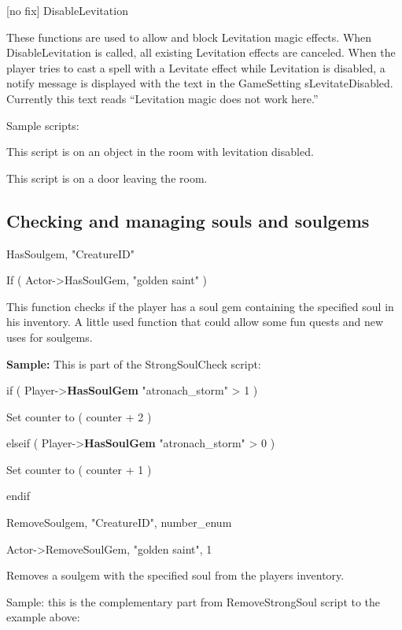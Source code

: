 \documentclass[
]{article}
\begin{document}
{[}no fix{]} DisableLevitation

These functions are used to allow and block Levitation magic effects.
When DisableLevitation is called, all existing Levitation effects are
canceled. When the player tries to cast a spell with a Levitate effect
while Levitation is disabled, a notify message is displayed with the
text in the GameSetting sLevitateDisabled. Currently this text reads
``Levitation magic does not work here.''

Sample scripts:

This script is on an object in the room with levitation disabled.



This script is on a door leaving the room.



\hypertarget{checking-and-managing-souls-and-soulgems}{%
\subsection{Checking and managing souls and
soulgems}\label{checking-and-managing-souls-and-soulgems}}

HasSoulgem, "CreatureID"

If ( Actor-\textgreater HasSoulGem, "golden saint" )

This function checks if the player has a soul gem containing the
specified soul in his inventory. A little used function that could allow
some fun quests and new uses for soulgems.

\textbf{Sample:} This is part of the StrongSoulCheck script:

if ( Player-\textgreater{}\textbf{HasSoulGem} "atronach\_storm"
\textgreater{} 1 )

Set counter to ( counter + 2 )

elseif ( Player-\textgreater{}\textbf{HasSoulGem} "atronach\_storm"
\textgreater{} 0 )

Set counter to ( counter + 1 )

endif

RemoveSoulgem, "CreatureID", number\_enum

Actor-\textgreater RemoveSoulGem, "golden saint", 1

Removes a soulgem with the specified soul from the players inventory.

Sample: this is the complementary part from RemoveStrongSoul script to
the example above:
\end{document}

